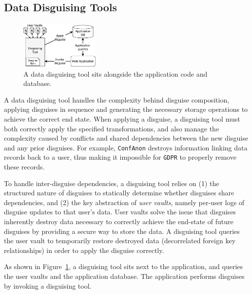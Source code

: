 \subsection{Data Disguising Tools}
\label{sec:composition}
\begin{figure}[t!]
    \centering
    \includegraphics[width=0.35\textwidth]{img/disguise_tool}

    \caption{A data disguising tool sits alongside the application code and database.}
    \label{fig:tool}
\end{figure}

A data disguising tool handles the complexity behind disguise composition, applying disguises in
sequence and generating the necessary storage operations to achieve the correct end state.
When applying a disguise, a disguising tool must both correctly apply the specified transformations, and also
manage the complexity caused by conflicts and shared dependencies between the new disguise and any
prior disguises.  For example, \texttt{ConfAnon} destroys information linking data records back to a
user, thus making it impossible for \texttt{GDPR} to properly remove these records.

To handle inter-disguise dependencies, a disguising tool relies on (1) the structured nature of disguises to
statically determine whether disguises share dependencies, and (2) the key abstraction of \emph{user
vaults}, namely per-user logs of disguise updates to that user's data.  User vaults solve the issue
that disguises inherently destroy data necessary to correctly achieve the end-state of future
disguises by providing a secure way to store the data. A disguising tool queries the user vault to
temporarily restore destroyed data (\eg decorrelated foreign key relationships) in order to apply
the disguise correctly.

As shown in Figure~\ref{fig:tool}, a disguising tool sits next to the application, and queries the
user vaults and the application database. The application performs disguises by invoking a
disguising tool.


